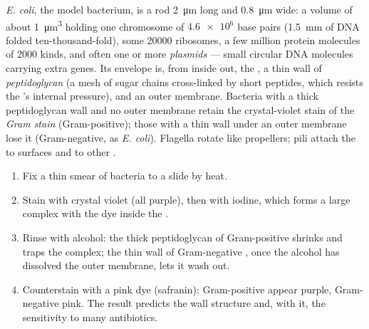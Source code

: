 \begin{proposition}\label{prop:b1:cell-unit-of-life:bacterium}
\emph{E. coli}, the model bacterium, is a rod \qty{2}{\micro m} long and
\qty{0.8}{\micro m} wide: a volume of about \qty{1}{\micro m^3} holding
one chromosome of $\num{4.6e6}$ base pairs (\qty{1.5}{mm} of DNA folded
ten-thousand-fold), some \num{20000} ribosomes, a few million protein
molecules of \num{2000} kinds, and often one or more
\emph{plasmids} --- small circular DNA molecules carrying
extra genes. Its envelope is, from inside out, the , a
thin wall of \emph{peptidoglycan} (a mesh of sugar
chains cross-linked by short peptides, which resists the 's
internal pressure), and an outer membrane. Bacteria with a thick
peptidoglycan wall and no outer membrane retain the crystal-violet
stain of the \emph{Gram stain} (Gram-positive); those
with a thin wall under an outer membrane lose it (Gram-negative, as
\emph{E. coli}). Flagella rotate like propellers; pili attach the 
to surfaces and to other .
\end{proposition}

\begin{method}\label{met:b1:cell-unit-of-life:gram}
\begin{enumerate}
  \item Fix a thin smear of bacteria to a slide by heat.
  \item Stain with crystal violet (all  purple), then with iodine,
        which forms a large complex with the dye inside the .
  \item Rinse with alcohol: the thick peptidoglycan of Gram-positive
         shrinks and traps the complex; the thin wall of
        Gram-negative , once the alcohol has dissolved the outer
        membrane, lets it wash out.
  \item Counterstain with a pink dye (safranin): Gram-positive 
        appear purple, Gram-negative pink. The result predicts the wall
        structure and, with it, the sensitivity to many antibiotics.
\end{enumerate}
\end{method}

